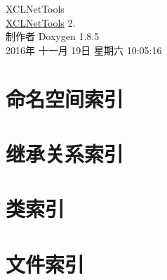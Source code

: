 \documentclass[twoside]{book}
\newcommand{\clearemptydoublepage}{%
  \newpage{\pagestyle{empty}\cleardoublepage}%
}
\begin{document}
\hypersetup{pageanchor=false}
\begin{titlepage}
\vspace*{7cm}
\begin{center}%
{\Large X\-C\-L\-Net\-Tools \\[1ex]\large \hyperlink{namespace_x_c_l_net_tools}{X\-C\-L\-Net\-Tools} 2. }\\
\vspace*{1cm}
{\large 制作者 Doxygen 1.8.5}\\
\vspace*{0.5cm}
{\small 2016年 十一月 19日 星期六 10:05:16}\\
\end{center}
\end{titlepage}
\clearemptydoublepage
\tableofcontents
\clearemptydoublepage
{}
\hypersetup{pageanchor=true}

\chapter{命名空间索引}

\chapter{继承关系索引}

\chapter{类索引}

\chapter{文件索引}

\end{document}
